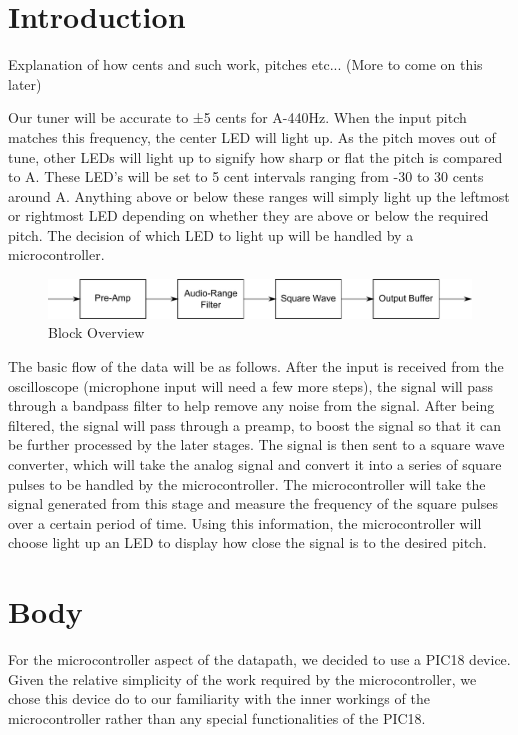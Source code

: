 \documentclass[12pt]{article}
\begin{document}
\section{Introduction}

Explanation of how cents and such work, pitches etc... (More to come on this later)

Our tuner will be accurate to ±5 cents for A-440Hz. When the input pitch matches this frequency, the
center LED will light up. As the pitch moves out of tune, other LEDs will light up to signify how sharp or
flat the pitch is compared to A. These LED's will be set to 5 cent intervals ranging from -30 to 30 cents
around A. Anything above or below these ranges will simply light up the leftmost or rightmost LED
depending on whether they are above or below the required pitch. The decision of which LED to light up
will be handled by a microcontroller.

\begin{figure}[H]
\centering
	\includegraphics[width=6in]{"Block Overview"}
	\caption{Block Overview}
	\label{1A} 
\end{figure}

The basic flow of the data will be as follows. After the input is received from the oscilloscope
(microphone input will need a few more steps), the signal will pass through a bandpass filter to help
remove any noise from the signal. After being filtered, the signal will pass through a preamp, to boost
the signal so that it can be further processed by the later stages. The signal is then sent to a square
wave converter, which will take the analog signal and convert it into a series of square pulses to be
handled by the microcontroller. The microcontroller will take the signal generated from this stage and
measure the frequency of the square pulses over a certain period of time. Using this information, the
microcontroller will choose light up an LED to display how close the signal is to the desired pitch.

\section{Body}

For the microcontroller aspect of the datapath, we decided to use a PIC18 device. Given the relative
simplicity of the work required by the microcontroller, we chose this device do to our familiarity with
the inner workings of the microcontroller rather than any special functionalities of the PIC18.
\end{document}
